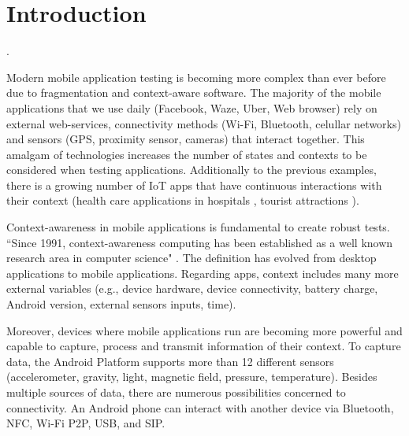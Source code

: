%
\chapter{Introduction} .
\label{sec:intro}


Modern mobile application testing is becoming more complex than ever before due to fragmentation and context-aware software. The majority of the mobile applications that we use daily (\eg Facebook, Waze, Uber, Web browser) rely on external web-services, connectivity methods (\eg Wi-Fi, Bluetooth, celullar networks) and sensors (\eg GPS, proximity sensor, cameras) that interact together. This amalgam of technologies increases the number of states and contexts to be considered when testing applications. Additionally to the previous examples, there is a growing number of IoT apps that have continuous interactions with their context (\eg health care applications in hospitals \cite{7724501}, tourist attractions \cite{8078373}).

Context-awareness in mobile applications is fundamental to create robust tests. “Since 1991, context-awareness computing has been established as a well known research area in computer science" \cite{6512846}. The definition has evolved from desktop applications to mobile applications. Regarding apps, context includes many more external variables (e.g., device hardware, device connectivity, battery charge, Android version, external sensors inputs, time).

Moreover, devices where mobile applications run are becoming more powerful and capable to capture, process and transmit information of their context. To capture data, the Android Platform supports more than 12 different sensors (\eg accelerometer, gravity, light, magnetic field, pressure, temperature)\cite{androidSensors}. Besides multiple sources of data, there are numerous possibilities concerned to connectivity. An Android phone can interact with another device via Bluetooth, NFC, Wi-Fi P2P, USB, and SIP. \cite{androidConnectivity}

